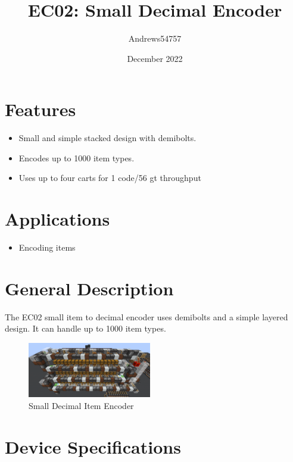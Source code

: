 \documentclass[10pt]{datasheet}
\title{EC02: Small Decimal Encoder}
\author{Andrews54757}
\date{December 2022}
\begin{document}
\maketitle

\section{Features}

\begin{itemize}
\item{Small and simple stacked design with demibolts.}
\item{Encodes up to 1000 item types.}
\item{Uses up to four carts for 1 code/56 gt throughput}
\end{itemize}

\section{Applications}

\begin{itemize}
\item{Encoding items}
\end{itemize}

\section{General Description}
The EC02 small item to decimal encoder uses demibolts and a simple layered design. It can handle up to 1000 item types.

\vfill\break

\begin{figure}[h]
    \centering
    \includegraphics[width=0.48\textwidth]{small.png}
    \caption{\centering Small Decimal Item Encoder}
\end{figure}

\onecolumn

\section{Device Specifications}
\end{document}
